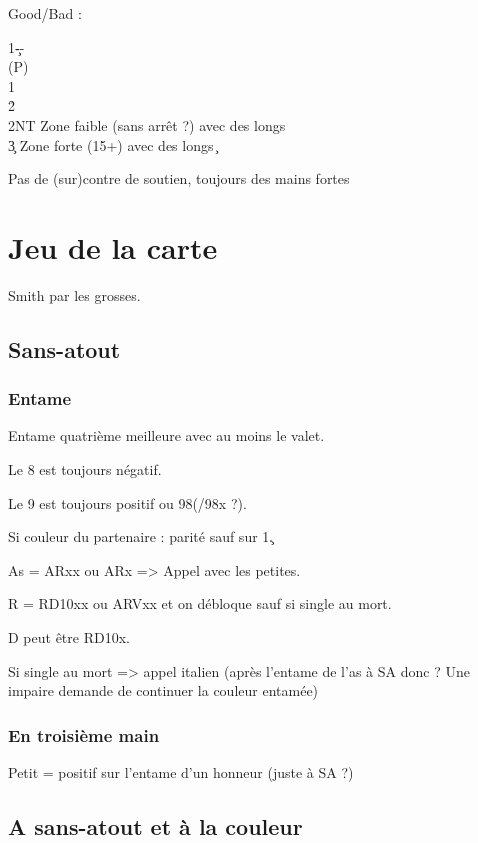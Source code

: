 \documentclass[a4paper]{article}
\begin{document}
Good/Bad :

\begin{bidtable}
1\c--\+\\
(P)\+\\
1\s\+\\
2\h\+\\
2NT \> Zone faible (sans arrêt ?) avec des longs \c \\
3\c \> Zone forte (15+) avec des longs \c \-\-\-\-
\end{bidtable}

Pas de (sur)contre de soutien, toujours des mains fortes

\section{Jeu de la carte}

Smith par les grosses.

\subsection{Sans-atout}

\subsubsection{Entame}

Entame quatrième meilleure avec au moins le valet.

Le 8 est toujours négatif.

Le 9 est toujours positif ou 98(/98x ?).

Si couleur du partenaire : parité sauf sur 1\c .

As = ARxx ou ARx => Appel avec les petites.

R = RD10xx ou ARVxx et on débloque sauf si single au mort.

D peut être RD10x.

Si single au mort => appel italien (après l'entame de l'as à SA donc ? Une impaire demande de continuer la couleur entamée)

\subsubsection{En troisième main}

Petit = positif sur l'entame d'un honneur (juste à SA ?)

\subsection{A sans-atout et à la couleur}
\end{document}
